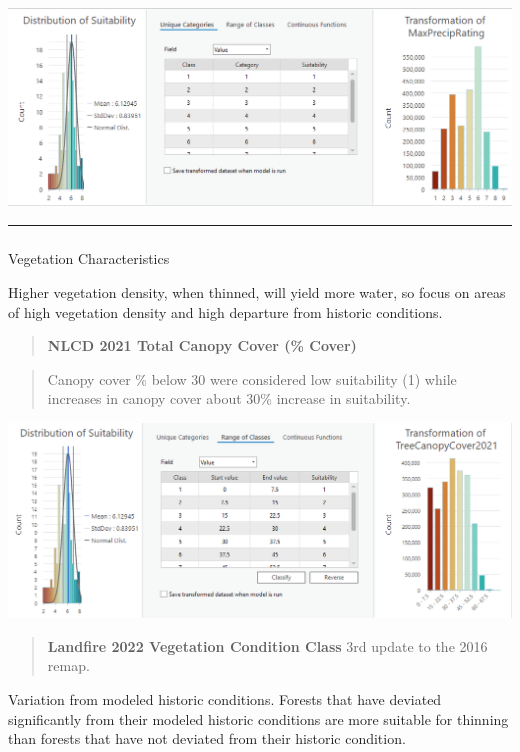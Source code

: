 \documentclass[
]{agujournal2019}
\makeatletter
\let\oldsubparagraph\subparagraph
\renewcommand{\subparagraph}{
    \@ifstar
      \xxxSubParagraphStar
      \xxxSubParagraphNoStar
  }
\newcommand{\xxxSubParagraphStar}[1]{\oldsubparagraph*{#1}\mbox{}}
\newcommand{\xxxSubParagraphNoStar}[1]{\oldsubparagraph{#1}\mbox{}}
\makeatother
\begin{document}
\includegraphics{images/Precipitation_suitability.PNG}

\begin{center}\rule{0.5\linewidth}{0.5pt}\end{center}

\subparagraph{Vegetation
Characteristics}\label{vegetation-characteristics}

Higher vegetation density, when thinned, will yield more water, so focus
on areas of high vegetation density and high departure from historic
conditions.

\begin{quote}
\textbf{NLCD 2021 Total Canopy Cover (\% Cover)}
\end{quote}

\begin{quote}
Canopy cover \% below 30 were considered low suitability (1) while
increases in canopy cover about 30\% increase in suitability.
\end{quote}

\includegraphics{images/CanopyCover_suitability.PNG}

\begin{quote}
\textbf{Landfire 2022 Vegetation Condition Class} 3rd update to the 2016
remap.
\end{quote}

Variation from modeled historic conditions. Forests that have deviated
significantly from their modeled historic conditions are more suitable
for thinning than forests that have not deviated from their historic
condition.
\end{document}
